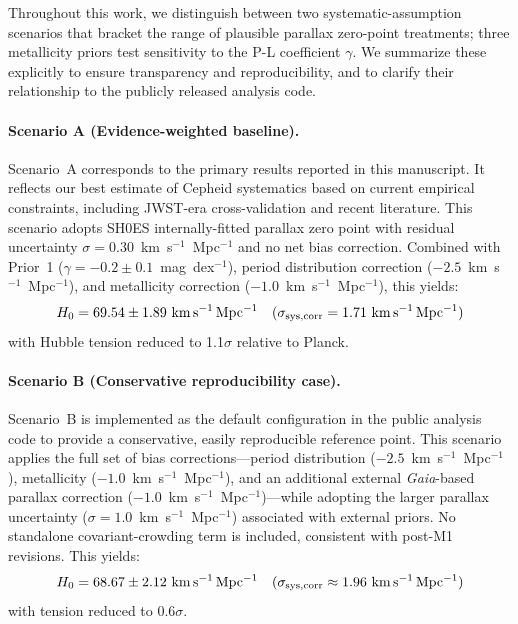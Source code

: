 \documentclass[preprint, linenumbers]{aastex701}
\begin{document}
Throughout this work, we distinguish between two systematic-assumption scenarios that bracket the range of plausible parallax zero-point treatments; three metallicity priors test sensitivity to the P-L coefficient $\gamma$. We summarize these explicitly to ensure transparency and reproducibility, and to clarify their relationship to the publicly released analysis code.

\paragraph{Scenario A (Evidence-weighted baseline).}
Scenario~A corresponds to the primary results reported in this manuscript. It reflects our best estimate of Cepheid systematics based on current empirical constraints, including JWST-era cross-validation and recent literature. This scenario adopts SH0ES internally-fitted parallax zero point with residual uncertainty $\sigma = 0.30$~km~s$^{-1}$~Mpc$^{-1}$ and no net bias correction. Combined with Prior~1 ($\gamma = -0.2 \pm 0.1$~mag~dex$^{-1}$), period distribution correction ($-2.5$~km~s$^{-1}$~Mpc$^{-1}$), and metallicity correction ($-1.0$~km~s$^{-1}$~Mpc$^{-1}$), this yields:
\begin{equation}
H_0 = 69.54 \pm 1.89~\mathrm{km\,s^{-1}\,Mpc^{-1}} \quad (\sigma_{\rm sys,corr} = 1.71~\mathrm{km\,s^{-1}\,Mpc^{-1}})
\end{equation}
with Hubble tension reduced to 1.1$\sigma$ relative to Planck.

\paragraph{Scenario B (Conservative reproducibility case).}
Scenario~B is implemented as the default configuration in the public analysis code to provide a conservative, easily reproducible reference point. This scenario applies the full set of bias corrections---period distribution ($-2.5$~km~s$^{-1}$~Mpc$^{-1}$), metallicity ($-1.0$~km~s$^{-1}$~Mpc$^{-1}$), and an additional external \textit{Gaia}-based parallax correction ($-1.0$~km~s$^{-1}$~Mpc$^{-1}$)---while adopting the larger parallax uncertainty ($\sigma = 1.0$~km~s$^{-1}$~Mpc$^{-1}$) associated with external priors. No standalone covariant-crowding term is included, consistent with post-M1 revisions. This yields:
\begin{equation}
H_0 = 68.67 \pm 2.12~\mathrm{km\,s^{-1}\,Mpc^{-1}} \quad (\sigma_{\rm sys,corr} \approx 1.96~\mathrm{km\,s^{-1}\,Mpc^{-1}})
\end{equation}
with tension reduced to 0.6$\sigma$.
\end{document}
